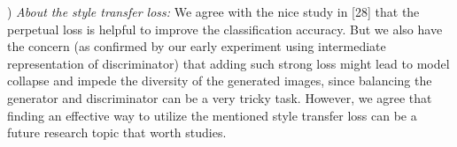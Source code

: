 \documentclass[10pt,twocolumn,letterpaper]{article}
\begin{document}

) \textit{About the style transfer loss:} 
We agree with the nice study in [28] that the perpetual loss is helpful to improve the classification accuracy.
But we also have the concern (as confirmed by our early experiment using intermediate representation of discriminator) that adding such strong loss might lead to model collapse and impede the diversity of the generated images, since balancing the generator and discriminator can be a very tricky task. However, we agree that finding an effective way to utilize the mentioned style transfer loss can be a future research topic that worth studies. 
 


\end{document}
